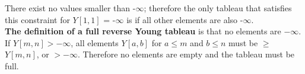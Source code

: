 \documentclass{article}
\begin{document}
\begin{enumerate}
\begin{enumerate}
	There exist no values smaller than -$\infty$; therefore the only tableau that satisfies this constraint for $Y[1,1]$ = -$\infty$ is if all other elements are also -$\infty$.\\
	
	\textbf{The definition of a full reverse Young tableau} is that no elements are $-\infty$. \\
	
	If $Y[m,n] > -\infty$, all elements $Y[a,b]$ for $a\leq m$ and $b\leq n$ must be $\geq$ $Y[m,n]$, or $> -\infty$. Therefore no elements are empty and the tableau must be full.
	
	\end{enumerate}  
	
	
\end{enumerate}
\end{document}
